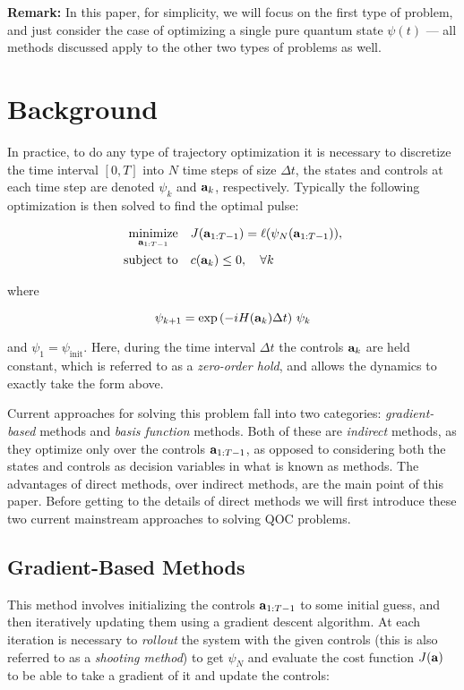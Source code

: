 \documentclass{article}
\newcommand{\minimize}[1]{\underset{#1}{\text{minimize}}}
\newcommand{\st}{\text{subject to}}
\begin{document}
\noindent
\textbf{Remark:} In this paper, for simplicity, we will focus on the first type of problem, and just consider the case of optimizing a single pure quantum state $\psi(t)$ --- all methods discussed apply to the other two types of problems as well.

\newpage
\section{Background}
In practice, to do any type of trajectory optimization it is necessary to discretize the time interval $[0, T]$ into $N$ time steps of size $\Delta t$, the states and controls at each time step are denoted $\psi_k$ and $\vb{a}_k$, respectively. Typically the following optimization is then solved to find the optimal pulse: 

\begin{align}
  \minimize{\vb{a}_{1:T-1}} \quad &J(\vb{a}_{1:T-1}) = \ell(\psi_N(\vb{a}_{1:T-1})), \\
  \st \quad &c(\vb{a}_k) \leq 0, \quad \forall k
\end{align}

\noindent
where 

\begin{equation}
  \psi_{k + 1} = \exp\qty(-i H(\vb{a}_k) \Delta t) \ \psi_k 
\end{equation}

\noindent
and $\psi_1 = \psi_{\text{init}}$.  Here, during the time interval $\Delta t$ the controls $\vb{a}_k$ are held constant, which is referred to as a \textit{zero-order hold}, and allows the dynamics to exactly take the form above. 

Current approaches for solving this problem fall into two categories: \textit{gradient-based} methods and \textit{basis function} methods.  Both of these are \textit{indirect} methods, as they optimize only over the controls $\vb{a}_{1:T-1}$, as opposed to considering both the states and controls as decision variables in what is known as  methods. The advantages of direct methods, over indirect methods, are the main point of this paper.  Before getting to the details of direct methods we will first introduce these two current mainstream approaches to solving QOC problems.

\subsection{Gradient-Based Methods}
This method involves initializing the controls $\vb{a}_{1:T-1}$ to some initial guess, and then iteratively updating them using a gradient descent algorithm.  At each iteration is necessary to \textit{rollout} the system with the given controls (this is also referred to as a \textit{shooting method}) to get $\psi_N$ and evaluate the cost function $J(\vb{a})$ to be able to take a gradient of it and update the controls:
\end{document}

